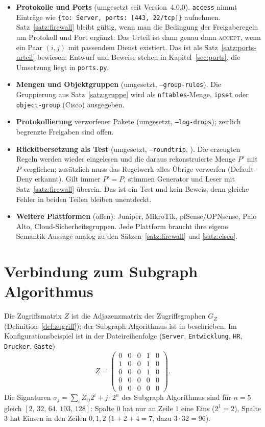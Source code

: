 \documentclass[a4paper,12pt, twoside]{report}
\theoremstyle{definition}
\newcommand{\code}[1]{\texttt{\detokenize{#1}}}
\begin{document}
\begin{itemize}
	\item \textbf{Protokolle und Ports} (umgesetzt seit Version~4.0.0). \texttt{access} nimmt Einträge wie \texttt{\{to: Server, ports: [443, 22/tcp]\}} aufnehmen. Satz~\ref{satz:firewall} bleibt gültig, wenn man die Bedingung der Freigaberegeln um Protokoll und Port ergänzt: Das Urteil ist dann genau dann \textsc{accept}, wenn ein Paar $(i,j)$ mit passendem Dienst existiert. Das ist als Satz~\ref{satz:ports-urteil} bewiesen; Entwurf und Beweise stehen in Kapitel~\ref{sec:ports}, die Umsetzung liegt in \texttt{ports.py}.
	\item \textbf{Mengen und Objektgruppen} (umgesetzt, \texttt{--group-rules}). Die Gruppierung aus Satz~\ref{satz:gruppe} wird als \texttt{nftables}-Menge, \texttt{ipset} oder \texttt{object-group} (Cisco) ausgegeben.
	\item \textbf{Protokollierung} verworfener Pakete (umgesetzt, \texttt{--log-drops}); zeitlich begrenzte Freigaben sind offen.
	\item \textbf{Rückübersetzung als Test} (umgesetzt, \texttt{--roundtrip}, \code{roundtrip.py}). Die erzeugten Regeln werden wieder eingelesen und die daraus rekonstruierte Menge $P'$ mit $P$ verglichen; zusätzlich muss das Regelwerk alles Übrige verwerfen (Default-Deny erkannt). Gilt immer $P' = P$, stimmen Generator und Leser mit Satz~\ref{satz:firewall} überein. Das ist ein Test und kein Beweis, denn gleiche Fehler in beiden Teilen bleiben unentdeckt.
	\item \textbf{Weitere Plattformen} (offen): Juniper, MikroTik, pfSense/OPNsense, Palo Alto, Cloud-Sicherheitsgruppen. Jede Plattform braucht ihre eigene Semantik-Aussage analog zu den Sätzen~\ref{satz:firewall} und \ref{satz:cisco}.
\end{itemize}

\section{Verbindung zum Subgraph Algorithmus}
\label{sec:subgraph-verbindung}

Die Zugriffsmatrix $Z$ ist die Adjazenzmatrix des Zugriffsgraphen $G_Z$ (Definition~\ref{def:zugriff}); der Subgraph Algorithmus ist in \cite{epp26} beschrieben. Im Konfigurationsbeispiel ist in der Dateireihenfolge (\texttt{Server}, \texttt{Entwicklung}, \texttt{HR}, \texttt{Drucker}, \texttt{Gäste})
\[
Z = \begin{pmatrix}
0 & 0 & 0 & 1 & 0 \\
1 & 0 & 0 & 1 & 0 \\
0 & 0 & 0 & 1 & 0 \\
0 & 0 & 0 & 0 & 0 \\
0 & 0 & 0 & 0 & 0
\end{pmatrix}.
\]
Die Signaturen $\sigma_j = \sum_i Z_{ij}2^i + j\cdot 2^n$ des Subgraph Algorithmus sind für $n = 5$ gleich $[2,\,32,\,64,\,103,\,128]$: Spalte $0$ hat nur an Zeile $1$ eine Eins ($2^1 = 2$), Spalte $3$ hat Einsen in den Zeilen $0,1,2$ ($1 + 2 + 4 = 7$, dazu $3\cdot32 = 96$).
\end{document}
